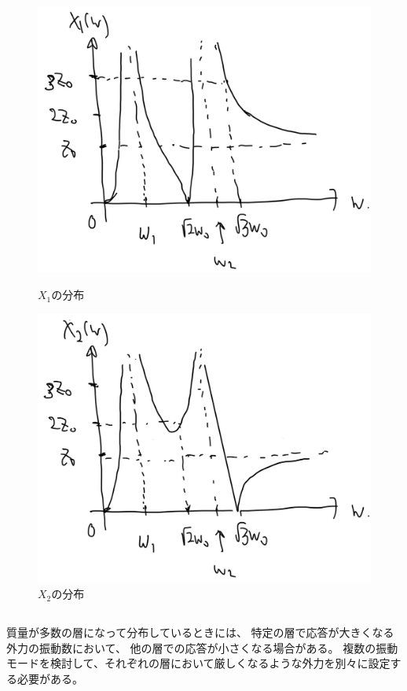\documentclass[a4paper]{jsarticle}
\begin{document}
\begin{figure}
  \begin{minipage}{0.5\hsize}
    \centering
    \includegraphics[width=\hsize]{fig3.png}
    \caption{$X_1$の分布}
  \end{minipage}
  \begin{minipage}{0.5\hsize}
    \centering
    \includegraphics[width=\hsize]{fig4.png}
    \caption{$X_2$の分布}
  \end{minipage}
\end{figure}

\subsection{}
質量が多数の層になって分布しているときには、
特定の層で応答が大きくなる外力の振動数において、
他の層での応答が小さくなる場合がある。
複数の振動モードを検討して、それぞれの層において厳しくなるような外力を別々に設定する必要がある。
\end{document}
